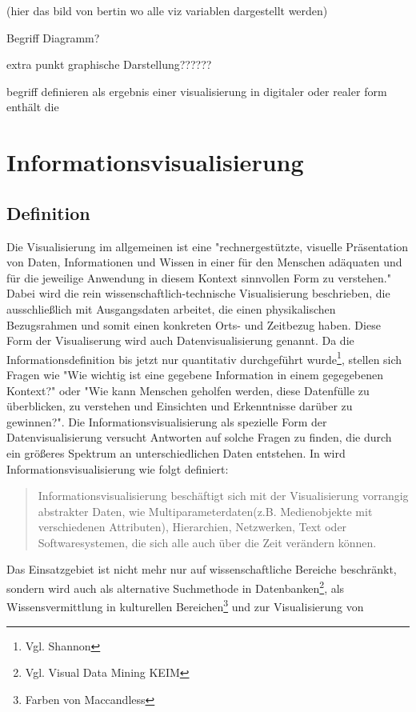 \documentclass[a4paper, 12pt, DIVcalc, onepage, pdftex, headsepline, footsepline]{scrreprt}
\begin{document}
(hier das bild von bertin wo alle viz variablen dargestellt werden)

Begriff Diagramm?

extra punkt graphische Darstellung??????

begriff definieren als ergebnis einer visualisierung in digitaler oder realer form
enthält die 

\chapter{Informationsvisualisierung}
\label{cha:Informationsvisualisierung}
\section{Definition}
\label{sec:Definition}
Die Visualisierung im allgemeinen ist eine "rechnergestützte, visuelle Präsentation von Daten, Informationen und Wissen
in einer für den Menschen adäquaten und für die jeweilige Anwendung in diesem Kontext sinnvollen Form
zu verstehen."\citep[S.\,3]{Schumann}
Dabei wird die rein wissenschaftlich-technische Visualisierung beschrieben, die ausschließlich mit Ausgangsdaten arbeitet,
die einen physikalischen Bezugsrahmen und somit einen konkreten Orts- und Zeitbezug haben. Diese Form der
Visualiserung wird auch Datenvisualisierung genannt.
Da die Informationsdefinition bis jetzt nur quantitativ durchgeführt wurde\footnote{Vgl. Shannon}, stellen sich 
Fragen wie "Wie wichtig ist eine gegebene Information in einem gegegebenen Kontext?"\citep[S.\,341]{Schumann}
oder "Wie kann Menschen geholfen werden, diese Datenfülle zu überblicken, zu verstehen und Einsichten und Erkenntnisse
darüber zu gewinnen?"\citep[S.\,435]{Preim}.
Die Informationsvisualisierung als spezielle Form der Datenvisualisierung versucht Antworten auf solche
Fragen zu finden, die durch ein größeres Spektrum an unterschiedlichen Daten entstehen.
In \citep[S.\,434]{Preim} wird Informationsvisualisierung wie folgt definiert:
\begin{quote}
Informationsvisualisierung beschäftigt sich mit der Visualisierung vorrangig abstrakter Daten, wie
Multiparameterdaten(z.B. Medienobjekte mit verschiedenen Attributen), Hierarchien, Netzwerken, Text
oder Softwaresystemen, die sich alle auch über die Zeit verändern können.
\end{quote}
Das Einsatzgebiet ist nicht mehr nur auf wissenschaftliche Bereiche beschränkt,
sondern wird auch als alternative Suchmethode in Datenbanken\footnote{Vgl. Visual Data Mining KEIM},
als Wissensvermittlung in kulturellen Bereichen\footnote{Farben von Maccandless} und zur Visualisierung von
\end{document}
